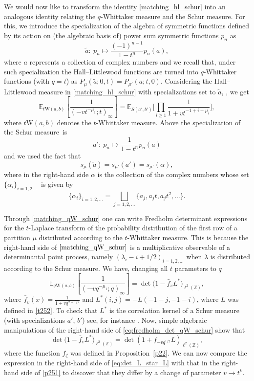 \documentclass[pdftex]{sigma}
\numberwithin{equation}{section}
\begin{document}
We would now like to transform the identity \eqref{matching_hl_schur} into an analogous identity relating the $q$-Whittaker measure and the Schur measure. For this, we introduce the specialization of the algebra of symmetric functions defined by its action on (the algebraic basis of) power sum symmetric functions $p_n$ as
	\[
 		\widetilde{a}\colon\ p_n \mapsto \frac{(-1)^{n-1}}{1-t^n} p_n(a),
	\]
	where $a$ represents a collection of complex numbers and we recall that, under such specialization the Hall--Littlewood functions are turned into $q$-Whittaker functions (with $q=t$) as $P_\mu(\widetilde{a};0,t) = P_{\mu'}(a;t,0)$.
	Considering the Hall--Littlewood measure in \eqref{matching_hl_schur} with specializations set to $\widetilde{a}$, , we get
	\begin{equation} \label{matching_qW_schur}
		\mathbb{E}_{t\mathrm{W}(a,b)}\left[ \frac{1}{(-vt^{-\mu_1};t)_\infty} \right] = \mathbb{E}_{S(a',b')}\Bigg[ \prod_{i\ge 1} \frac{1}{1+v t^{-1+i-\mu_i}} \Bigg],
	\end{equation}
	where $t\mathrm{W}(a,b)$ denotes the $t$-Whittaker measure. Above the specialization of the Schur measure~is
	\[
		a' \colon\ p_n \mapsto \frac{1}{1-t^n} p_n(a)
	\]
	and we used the fact that
\[
s_\mu(\widetilde{a}) = s_{\mu'}(a')=s_{\mu'}(\alpha),
\]
where in the right-hand side $\alpha$
is the collection of the complex numbers whose set $\{\alpha_i\}_{i=1,2,\dots}$ is given by
\[%
 \{\alpha_i\}_{i=1,2,\dots}=\bigsqcup_{j=1,2,\dots}\big\{a_j,a_jt,a_jt^2,\dots\big\}.
\]

Through \eqref{matching_qW_schur} one can write Fredholm determinant expressions for the $t$-Laplace transform of the probability distribution of the first row of a partition $\mu$ distributed according to the $t$-Whittaker measure. This is because the right-hand side of $\eqref{matching_qW_schur}$ is a multiplicative observable of a determinantal point process, namely $(\lambda_i-i+1/2)_{i=1,2,\dots}$ when $\lambda$ is distributed according to the Schur measure. We have, changing all $t$ parameters to $q$
 \begin{equation} \label{eq:fredholm_det_qW_schur}
 \mathbb{E}_{q\mathrm{W}(a,b)}\left[ \frac{1}{(-vq^{-\mu_1};q)_\infty} \right] = \det \big( 1- \bar{f}_v L^* \big)_{\ell^2(\mathbb{Z})},
 \end{equation}
 where $\bar{f}_v(x) = \frac{ 1 }{1 + v q^{x+1/2}}$
 and $L^*(i,j)=-L(-1-j,-1-i)$, where $L$ was defined in \eqref{t252}. To check that $L^*$ is the correlation kernel of a Schur measure (with specializations $a'$, $b'$) see, for instance \cite[Theorem~1.1]{aggarwal2015correlation_schur}. Now, simple algebraic manipulations of the right-hand side of \eqref{eq:fredholm_det_qW_schur} show that
 \begin{equation} \label{eq:det_L_star_L}
 	\det \big( 1- \bar{f}_v L^* \big)_{\ell^2(\mathbb{Z})} = \det ( 1+ f_{-vq^{1/2}} L )_{\ell^2(\mathbb{Z})},
 \end{equation}
 where the function $f_\zeta$ was defined in Proposition~\ref{p22}. We can now compare the expression in the right-hand side of \eqref{eq:det_L_star_L} with that in the right-hand side of \eqref{p251} to discover that they differ by a change of parameter $v\to t^k$.
\end{document}
